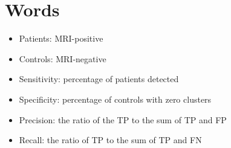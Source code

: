 \documentclass[a4paper,french,english]{report}
\begin{document}
\tableofcontents

\newpage

\chapter{Words}

\begin{itemize}
	\item Patients: MRI-positive
	\item Controls: MRI-negative
	\item Sensitivity: percentage of patients detected
	\item Specificity: percentage of controls with zero clusters
	\item Precision: the ratio of the TP to the sum of TP and FP
	\item Recall: the ratio of TP to the sum of TP and FN
\end{itemize}








\end{document}
